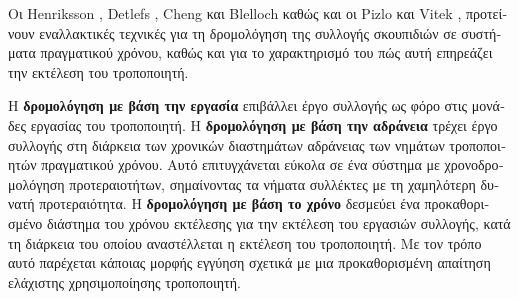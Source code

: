 \begin{greek}
Οι Henriksson \cite{henriksson1998scheduling}, Detlefs \cite{DBLP:conf/isorc/Detlefs04},
Cheng και Blelloch \cite{DBLP:conf/pldi/ChengB01} καθώς και
οι Pizlo και Vitek \cite{DBLP:conf/pldi/PizloPS08}, προτείνουν
εναλλακτικές τεχνικές για τη δρομολόγηση της συλλογής σκουπιδιών
σε συστήματα πραγματικού χρόνου, καθώς και για το χαρακτηρισμό
του πώς αυτή επηρεάζει την εκτέλεση του τροποποιητή.

Η \textbf{δρομολόγηση με βάση την εργασία} επιβάλλει έργο
συλλογής ως φόρο στις μονάδες εργασίας του τροποποιητή. Η
\textbf{δρομολόγηση με βάση την αδράνεια} τρέχει έργο συλλογής
στη διάρκεια των χρονικών διαστημάτων αδράνειας των νημάτων
τροποποιητών πραγματικού χρόνου. Αυτό επιτυγχάνεται εύκολα σε ένα
σύστημα με χρονοδρομολόγηση προτεραιοτήτων, σημαίνοντας τα νήματα
συλλέκτες με τη χαμηλότερη δυνατή προτεραιότητα.
Η \textbf{δρομολόγηση με βάση το χρόνο} δεσμεύει ένα προκαθορισμένο
διάστημα του χρόνου εκτέλεσης για την εκτέλεση του εργασιών
συλλογής, κατά τη διάρκεια του οποίου αναστέλλεται η εκτέλεση του
τροποποιητή. Με τον τρόπο αυτό παρέχεται κάποιας μορφής εγγύηση
σχετικά με μια προκαθορισμένη απαίτηση ελάχιστης χρησιμοποίησης
τροποποιητή. 

\end{greek}
